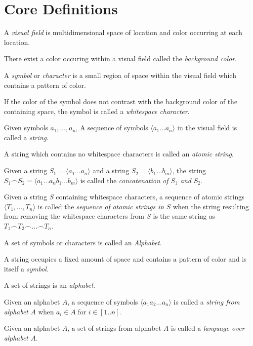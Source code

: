 \documentclass{article}
\newcommand{\nl}{\bigskip\noindent}
\newcommand{\seq}[1]{\langle #1\rangle}
\newcommand{\defcon}[1]{\emph{#1}}
\newcommand{\seqcat}{\frown}
\begin{document}
\section{Core Definitions}

\nl A \defcon{visual field} is multidimensional space of location and color occurring at each location. 

\nl There exist a color occuring within a visual field called the \defcon{background color}.

\nl A \defcon{symbol} or \defcon{character} is a small region of space within the visual field which contains a pattern of color.  

\nl If the color of the symbol does not contrast with the background color of the containing space, the symbol is called a \defcon{whitespace character}.  

\nl Given symbols $a_1, \dots, a_n$, A sequence of symbols $\seq{a_1\dots a_n}$ in the visual field is called a \defcon{string}.

\nl A string which contains no whitespace characters is called an \defcon{atomic string}.

\nl Given a string $S_1= \seq{a_1\dots a_n}$ and a string $S_2 = \seq{b_1\dots b_m}$, the string $S_1\seqcat S_2 = \seq{a_1\dots a_nb_1\dots b_m}$ is called the \defcon{concatenation of $S_1$ and $S_2$}.

\nl Given a string $S$ containing whitespace characters, a sequence of atomic strings $\seq{T_1,\dots, T_n}$ is called the \defcon{sequence of atomic strings in $S$} when the string resulting from removing the whitespace characters from $S$ is the same string as $T_1\seqcat T_2\seqcat\dots \seqcat T_n$.

\nl A set of symbols or characters is called an \defcon{Alphabet}.

\nl A string occupies a fixed amount of space and contains a pattern of color and is itself a \defcon{symbol}.

\nl A set of strings is an \defcon {alphabet}.

\nl Given an alphabet $A$, a sequence of symbols $\seq{a_1a_2\dots a_n}$  is called a \defcon{string from alphabet $A$}  when  $a_i\in A$ for $i\in[1..n]$.

\nl Given an alphabet $A$, a set of strings from alphabet $A$ is called a \defcon{language over alphabet $A$}.


 
\end{document}
